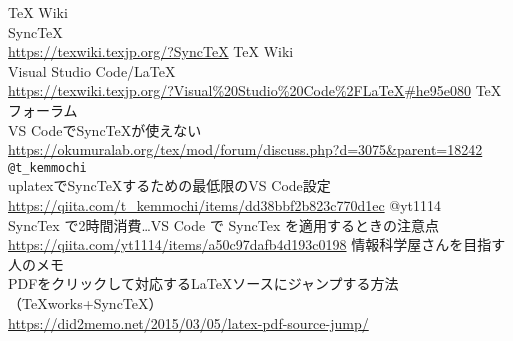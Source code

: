 \documentclass{ltjsarticle}
\begin{document}
\begin{thebibliography}{999}
  TeX Wiki\\
  SyncTeX\\
  \url{https://texwiki.texjp.org/?SyncTeX}
  TeX Wiki\\
  Visual Studio Code/LaTeX\\
  \url{https://texwiki.texjp.org/?Visual%20Studio%20Code%2FLaTeX#he95e080}
  TeXフォーラム\\
  VS CodeでSyncTeXが使えない\\
  \url{https://okumuralab.org/tex/mod/forum/discuss.php?d=3075&parent=18242}
  \verb|@t_kemmochi|\\
  uplatexでSyncTeXするための最低限のVS Code設定\\
  \url{https://qiita.com/t_kemmochi/items/dd38bbf2b823c770d1ec}
  @yt1114\\
  SyncTex で2時間消費…VS Code で SyncTex を適用するときの注意点\\
  \url{https://qiita.com/yt1114/items/a50c97dafb4d193c0198}
  情報科学屋さんを目指す人のメモ\\
  PDFをクリックして対応するLaTeXソースにジャンプする方法（TeXworks+SyncTeX）\\
  \url{https://did2memo.net/2015/03/05/latex-pdf-source-jump/}


\end{thebibliography}
\end{document}
